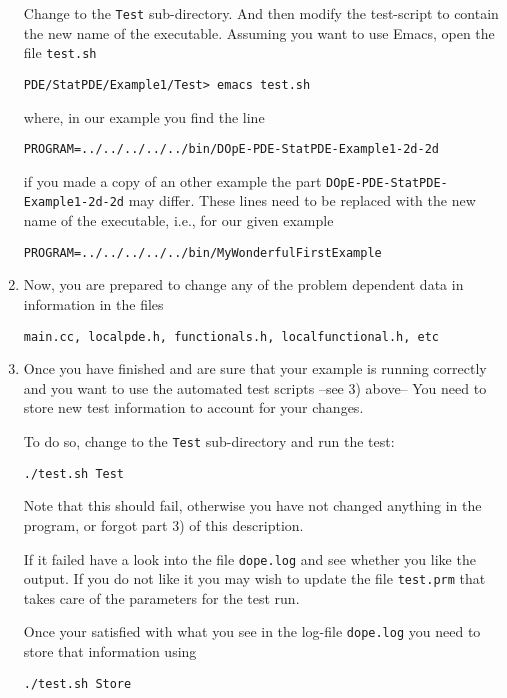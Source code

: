 \begin{enumerate}
  Change to the \texttt{Test} sub-directory. And then modify the
  test-script to contain the new name of the executable.
  Assuming you want to use Emacs, open the file \texttt{test.sh}
\begin{verbatim}
PDE/StatPDE/Example1/Test> emacs test.sh
\end{verbatim}
where, in our example you find the line
\begin{verbatim}
PROGRAM=../../../../../bin/DOpE-PDE-StatPDE-Example1-2d-2d
\end{verbatim} 
if you made a copy of an other example the part \texttt{DOpE-PDE-StatPDE-Example1-2d-2d}
may differ. These lines need to be replaced with the new name of the 
executable, i.e., for our given example
\begin{verbatim}
PROGRAM=../../../../../bin/MyWonderfulFirstExample
\end{verbatim} 

\item  Now, you are prepared to change any of the problem
  dependent data in information in the files 
\begin{verbatim}
main.cc, localpde.h, functionals.h, localfunctional.h, etc
\end{verbatim} 

\item Once you have finished and are sure that your example is running correctly
  and you want to use the automated test scripts --see 3) above-- You need 
  to store new test information to account for your changes. 
  
  To do so, change to the \texttt{Test} sub-directory and run the test:
\begin{verbatim}
./test.sh Test
\end{verbatim}
  Note that this should fail, otherwise you have not changed anything in the program, 
  or forgot part 3) of this description.
  
  If it failed have a look into the file \texttt{dope.log} and see whether you like the 
  output. If you do not like it you may wish to update the file \texttt{test.prm} that 
  takes care of the parameters for the test run.
  
  Once your satisfied with what you see in the log-file \texttt{dope.log} you need to store 
  that information using
\begin{verbatim}
./test.sh Store
\end{verbatim}
\end{enumerate}


